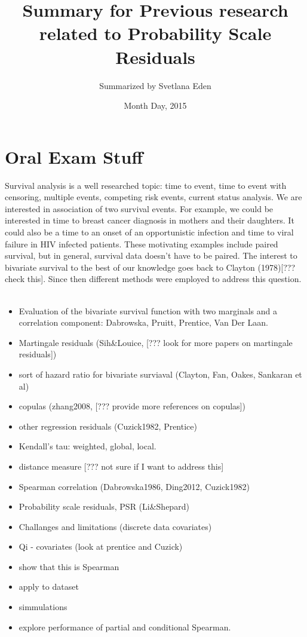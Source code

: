 \documentclass[]{article}
\title{Summary for Previous research related to Probability Scale Residuals}
\author{Summarized by Svetlana Eden}
\date{Month Day, 2015}
\begin{document}
\maketitle
\tableofcontents
\listoffigures
\listoftables
\clearpage

\section{Oral Exam Stuff}
Survival analysis is a well researched topic: time to event, time to event with censoring, multiple events, competing risk events, current status analysis. We are interested in association of two survival events. For example, we could be interested in time to breast cancer diagnosis in mothers and their daughters. It could also be a time to an onset of an opportunistic infection and time to viral failure in HIV infected patients. These motivating examples include paired survival, but in general, survival data doesn't have to be paired. The interest to bivariate survival to the best of our knowledge goes back to Clayton (1978)[??? check this]. Since then different methods were employed to address this question.\\
~\\
\begin{itemize}
	\item Evaluation of the bivariate survival function with two marginals and a correlation component:
	Dabrowska, Pruitt, Prentice, Van Der Laan.
	\item Martingale residuals (Sih\&Louice, [??? look for more papers on martingale residuals])
	\item sort of hazard ratio for bivariate surviaval (Clayton, Fan, Oakes, Sankaran et al)
	\item copulas (zhang2008, [??? provide more references on copulas])
	\item other regression residuals (Cuzick1982, Prentice)
	\item Kendall's tau: weighted, global, local. 
	\item distance measure [??? not sure if I want to address this]
	\item Spearman correlation (Dabrowska1986, Ding2012, Cuzick1982)
	\item Probability scale residuals, PSR (Li\&Shepard)
	\item Challanges and limitations (discrete data covariates)
	\item Qi - covariates (look at prentice and Cuzick)
	\item show that this is Spearman
	\item apply to dataset
	\item simmulations
	\item explore performance of partial and conditional Spearman.
\end{itemize}
\end{document}
